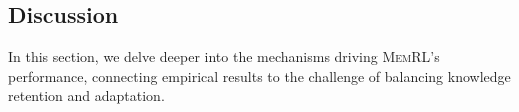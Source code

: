 \documentclass{article}
\theoremstyle{plain}
\theoremstyle{definition}
\theoremstyle{remark}
\begin{document}







\subsection{Discussion}

In this section, we delve deeper into the mechanisms driving \textsc{MemRL}'s performance, connecting empirical results to the challenge of balancing knowledge retention and adaptation.


    
    
\end{document}
